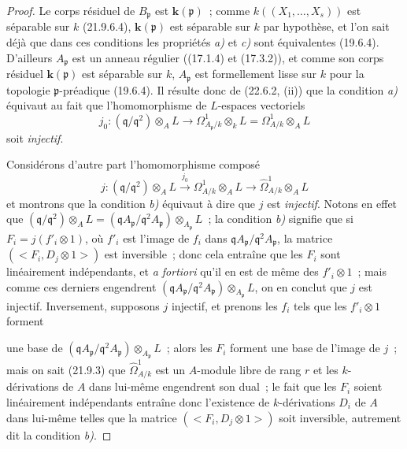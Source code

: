 \begin{proof}
Le corps résiduel de $B_{\mathfrak p}$ est $\boldsymbol{k}(\mathfrak p)$~; comme
$k((X_1,\ldots,X_s))$ est séparable sur $k$ (21.9.6.4), $\boldsymbol{k}(\mathfrak p)$ est
séparable sur $k$ par hypothèse, et l'on sait déjà que dans ces conditions les
propriétés \emph{a)} et \emph{c)} sont équivalentes (19.6.4). D'ailleurs
$A_{\mathfrak p}$ est un anneau régulier ((17.1.4) et (17.3.2)), et comme son
corps résiduel $\boldsymbol{k}(\mathfrak p)$ est séparable sur $k$, $A_{\mathfrak p}$ est
formellement lisse sur $k$ pour la topologie $\mathfrak p$-préadique
(19.6.4). Il résulte donc de (22.6.2, (ii)) que la condition \emph{a)} équivaut au
fait que l'homomorphisme de $L$-espaces vectoriels
\begin{equation}
\label{0.22.7.2.1-fr}
  j_0:(\mathfrak q/\mathfrak q^2)\otimes_AL
  \longrightarrow\Omega^1_{A_{\mathfrak p}/k}\otimes_kL
  =\Omega^1_{A/k}\otimes_AL
  \tag{22.7.2.1}
\end{equation}
soit \emph{injectif}.

Considérons d'autre part l'homomorphisme composé
\begin{equation}
\label{0.22.7.2.2-fr}
  j:(\mathfrak q/\mathfrak q^2)\otimes_AL
  \xrightarrow{j_0}\Omega^1_{A/k}\otimes_AL
  \longrightarrow\widehat\Omega^1_{A/k}\otimes_AL
  \tag{22.7.2.2}
\end{equation}
et montrons que la condition \emph{b)} équivaut à dire que $j$ est \emph{injectif}. Notons en
effet que
$(\mathfrak q/\mathfrak q^2)\otimes_AL
=(\mathfrak qA_{\mathfrak p}/\mathfrak q^2A_{\mathfrak p})
\otimes_{A_{\mathfrak p}}L$~;
la condition \emph{b)} signifie que si $F_i=j(f'_i\otimes1)$, où $f'_i$ est l'image
de $f_i$ dans
$\mathfrak qA_{\mathfrak p}/\mathfrak q^2A_{\mathfrak p}$, la matrice
$(\mathopen{<}F_i,D_j\otimes1\mathclose{>})$ est inversible~; donc cela entraîne que les
$F_i$ sont linéairement indépendants, et \emph{a fortiori} qu'il en est de
même des $f'_i\otimes1$~; mais comme ces derniers engendrent
$(\mathfrak qA_{\mathfrak p}/\mathfrak q^2A_{\mathfrak p})
\otimes_{A_{\mathfrak p}}L$, on en conclut que $j$ est injectif. Inversement,
supposons $j$ injectif, et prenons les $f_i$ tels que les $f'_i\otimes1$
forment


une base de
$(\mathfrak qA_{\mathfrak p}/\mathfrak q^2A_{\mathfrak p})
\otimes_{A_{\mathfrak p}}L$~; alors les $F_i$ forment une base de l'image de
$j$~; mais on sait (21.9.3) que $\widehat\Omega^1_{A/k}$ est un $A$-module
libre de rang $r$ et les $k$-dérivations de $A$ dans lui-même engendrent son
dual~; le fait que les $F_i$ soient linéairement indépendants entraîne donc
l'existence de $k$-dérivations $D_i$ de $A$ dans lui-même telles que la matrice
$(\mathopen{<}F_i,D_j\otimes1\mathclose{>})$ soit inversible, autrement dit la condition
\emph{b)}.


\end{proof}
